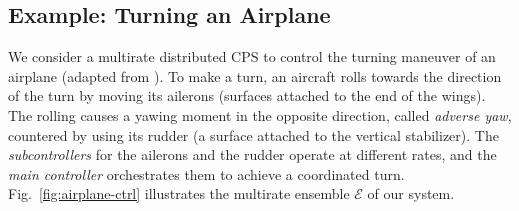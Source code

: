 \subsection{Example: Turning an Airplane}
\label{sec:ex-airplane}

We consider a multirate distributed CPS
to control the turning maneuver of an airplane (adapted from \cite{ftscs-journal}).
%
To make a turn, an aircraft rolls towards the direction of the turn
by moving its ailerons (surfaces attached to the end of the wings).
The rolling causes 
a yawing moment in the opposite direction, called \emph{adverse yaw},
countered by using its rudder (a surface attached to the vertical stabilizer).
%
The \emph{subcontrollers} for the ailerons and the rudder operate at different rates, 
and the \emph{main controller} orchestrates them to achieve a coordinated turn.
%
Fig.~\ref{fig:airplane-ctrl} illustrates the multirate ensemble $\mathcal{E}$ of our system.


